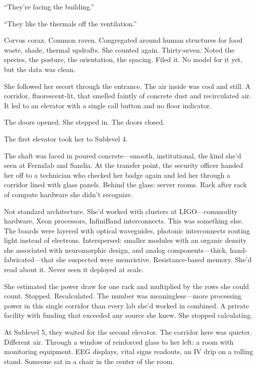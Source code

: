 ``They're facing the building.''

``They like the thermals off the ventilation.''

Corvus corax. Common raven. Congregated around human structures for food waste, shade, thermal updrafts. She counted again. Thirty-seven. Noted the species, the posture, the orientation, the spacing. Filed it. No model for it yet, but the data was clean.

She followed her escort through the entrance. The air inside was cool and still. A corridor, fluorescent-lit, that smelled faintly of concrete dust and recirculated air. It led to an elevator with a single call button and no floor indicator.

The doors opened. She stepped in. The doors closed.

\scenebreak

The first elevator took her to Sublevel 4.

The shaft was faced in poured concrete---smooth, institutional, the kind she'd seen at Fermilab and Sandia. At the transfer point, the security officer handed her off to a technician who checked her badge again and led her through a corridor lined with glass panels. Behind the glass: server rooms. Rack after rack of compute hardware she didn't recognize.

Not standard architecture. She'd worked with clusters at LIGO---commodity hardware, Xeon processors, InfiniBand interconnects. This was something else. The boards were layered with optical waveguides, photonic interconnects routing light instead of electrons. Interspersed: smaller modules with an organic density she associated with neuromorphic design, and analog components---thick, hand-fabricated---that she suspected were memristive. Resistance-based memory. She'd read about it. Never seen it deployed at scale.

She estimated the power draw for one rack and multiplied by the rows she could count. Stopped. Recalculated. The number was meaningless---more processing power in this single corridor than every lab she'd worked in combined. A private facility with funding that exceeded any source she knew. She stopped calculating.

At Sublevel 5, they waited for the second elevator. The corridor here was quieter. Different air. Through a window of reinforced glass to her left: a room with monitoring equipment. EEG displays, vital signs readouts, an IV drip on a rolling stand. Someone sat in a chair in the center of the room.

